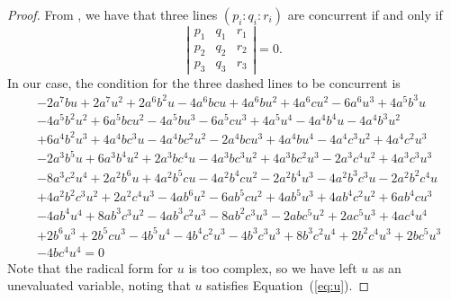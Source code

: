 \documentclass[12pt,a4paper]{amsart}
\begin{document}
\begin{proof}
From \cite[\S 4.3]{Yiu}, we have that three lines $(p_i:q_i:r_i)$ are concurrent if and only if
$$\left|
\begin{array}{lll}
p_1&q_1&r_1\\
p_2&q_2&r_2\\
p_3&q_3&r_3
\end{array}
\right|=0.$$
In our case, the condition for the three dashed lines to be concurrent is
\begin{equation}
\label{eq:2}
\begin{aligned}
&-2 a^7 b u+2 a^7 u^2+2 a^6 b^2 u-4 a^6 b c u+4 a^6 b u^2+4 a^6 c u^2-6 a^6 u^3+4 a^5 b^3 u\\
&-4 a^5 b^2u^2+6 a^5 b c u^2-4 a^5 b u^3-6 a^5 c u^3+4 a^5 u^4-4 a^4 b^4 u-4 a^4 b^3 u^2\\
&+6 a^4 b^2 u^3+4 a^4 bc^3 u-4 a^4 b c^2 u^2-2 a^4 b c u^3+4 a^4 b u^4-4 a^4 c^3 u^2+4 a^4 c^2 u^3\\
&-2 a^3 b^5 u+6 a^3 b^4u^2+2 a^3 b c^4 u-4 a^3 b c^3 u^2+4 a^3 b c^2 u^3-2 a^3 c^4 u^2+4 a^3 c^3 u^3\\
&-8 a^3 c^2 u^4+2 a^2 b^6u+4 a^2 b^5 c u-4 a^2 b^4 c u^2-2 a^2 b^4 u^3-4 a^2 b^3 c^3 u-2 a^2 b^2 c^4 u\\
&+4 a^2 b^2 c^3 u^2+2 a^2c^4 u^3-4 a b^6 u^2-6 a b^5 c u^2+4 a b^5 u^3+4 a b^4 c^2 u^2+6 a b^4 c u^3\\
&-4 a b^4 u^4+8 a b^3 c^3u^2-4 a b^3 c^2 u^3-8 a b^2 c^3 u^3-2 a b c^5 u^2+2 a c^5 u^3+4 a c^4 u^4\\
&+2 b^6 u^3+2 b^5 c u^3-4 b^5u^4-4 b^4 c^2 u^3-4 b^3 c^3 u^3+8 b^3 c^2 u^4+2 b^2 c^4 u^3+2 b c^5 u^3\\
&-4 b c^4 u^4=0
\end{aligned}
\end{equation}
Note that the radical form for $u$ is too complex, so we have left $u$ as an unevaluated variable,
noting that $u$ satisfies Equation~(\ref{eq:u}).


\end{proof}
\end{document}
